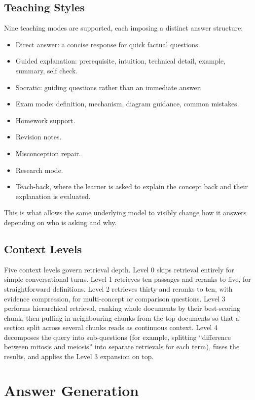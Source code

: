 \subsection{Teaching Styles}\label{3.4.1}

Nine teaching modes are supported, each imposing a distinct answer
structure:

\begin{itemize}
\item Direct answer: a concise response for quick factual questions.
\item Guided explanation: prerequisite, intuition, technical detail,
example, summary, self check.
\item Socratic: guiding questions rather than an immediate answer.
\item Exam mode: definition, mechanism, diagram guidance, common mistakes.
\item Homework support.
\item Revision notes.
\item Misconception repair.
\item Research mode.
\item Teach-back, where the learner is asked to explain the concept back
and their explanation is evaluated.
\end{itemize}

This is what allows the same underlying model to visibly change how it
answers depending on who is asking and why.

\subsection{Context Levels}\label{3.4.2}

Five context levels govern retrieval depth. Level 0 skips retrieval
entirely for simple conversational turns. Level 1 retrieves ten passages
and reranks to five, for straightforward definitions. Level 2 retrieves
thirty and reranks to ten, with evidence compression, for multi-concept
or comparison questions. Level 3 performs hierarchical retrieval, 
ranking whole documents by their best-scoring chunk, then pulling in
neighbouring chunks from the top documents so that a section split across
several chunks reads as continuous context. Level 4 decomposes the query
into sub-questions (for example, splitting ``difference between mitosis
and meiosis'' into separate retrievals for each term), fuses the results,
and applies the Level 3 expansion on top.

\section{Answer Generation}\label{3.5}

